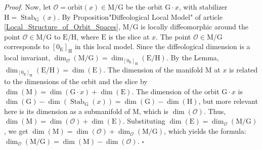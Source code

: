 \documentclass[10pt,reqno,letterpaper,twoside]{amsart}
\theoremstyle{article}
\renewenvironment{proof}%
{\noindent\textit{Proof.}}%
{\nolinebreak\hfill $\square$}
\newcommand{\cO}{{\mathcal O}}
\def \E{\mathrm E}
\def \G{\mathrm G}
\def \H{\mathrm H}
\def \M{\mathrm M}
\DeclareMathOperator{\Stab}{Stab}
\newcommand{\orbit}{{\mathrm{orbit}}}
\def \H{\mathrm H} %
\begin{document}
\begin{proof}
    Now,
    let $\cO = \orbit(x) \in \M/\G$ be the orbit $\G \cdot x$,
    with stabilizer $\H = \Stab_\G(x)$.
    By Proposition"Diffeological Local Model" of article \ref{Local_Structure_of_Orbit_Spaces},
    $\M/\G$ is locally diffeomorphic around the point $\cO \in \M/\G$ to $\E/\H$,
    where $\E$ is the slice at $x$.
    The point $\cO \in \M/\G$ corresponds to $[0_{\E}]_{\H}$ in this local model.
    Since the diffeological dimension is a local invariant,
    $\dim_{\cO}(\M/\G) = \dim_{[0_{\E}]_{\H}}(\E/\H)$.
    By the Lemma,
    $\dim_{[0_{\E}]_{\H}}(\E/\H) = \dim(\E)$.
    The dimension of the manifold $\M$ at $x$ is related to the dimensions of the orbit and the slice by $\dim(\M) = \dim(\G \cdot x) + \dim(\E)$.
    The dimension of the orbit $\G \cdot x$ is $\dim(\G) - \dim(\Stab_\G(x)) = \dim(\G) - \dim(\H)$,
    but more relevant here is its dimension as a submanifold of $\M$,
    which is $\dim(\cO)$. Thus, $\dim(\M) = \dim(\cO) + \dim(\E)$.
    Substituting $\dim(\E) = \dim_{\cO}(\M/\G)$,
    we get $\dim(\M) = \dim(\cO) + \dim_{\cO}(\M/\G)$,
    which yields the formula: $\dim_{\cO}(\M/\G) = \dim(\M) - \dim(\cO)$.
  \end{proof}
  
  
\end{document}
